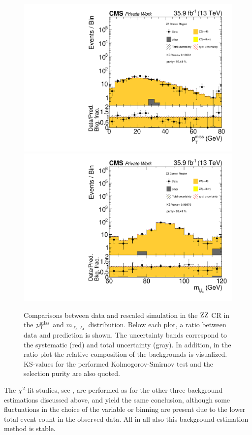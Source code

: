 \begin{figure}[tbp]
 \centering
 \includegraphics[width=\pairwidth]{figures/plots_CR_zz/CRZZ_LL_nom_met_log}
 \includegraphics[width=\pairwidth]{figures/plots_CR_zz/CRZZ_LL_nom_m_ll2_log}
 \caption{Comparisons between data and rescaled simulation in the $\mathrm{Z}\mathrm{Z}$ CR in the $p_{\mathrm{T}}^\text{miss}$ and $m_{\ell_3\ell_4}$ distribution. Below each plot, a ratio between data and prediction is shown. The uncertainty bands correspond to the systematic (red) and total uncertainty (gray). In addition, in the ratio plot the relative composition of the backgrounds is visualized. KS-values for the performed Kolmogorov-Smirnov test and the selection purity are also quoted.}
 \label{fig:CRZZ}
\end{figure}
The $\chi^2$-fit studies, see , are performed as for the other three background estimations discussed above, and yield the same conclusion, although some fluctuations in the choice of the variable or binning are present due to the lower total event count in the observed data. All in all also this background estimation method is stable.
